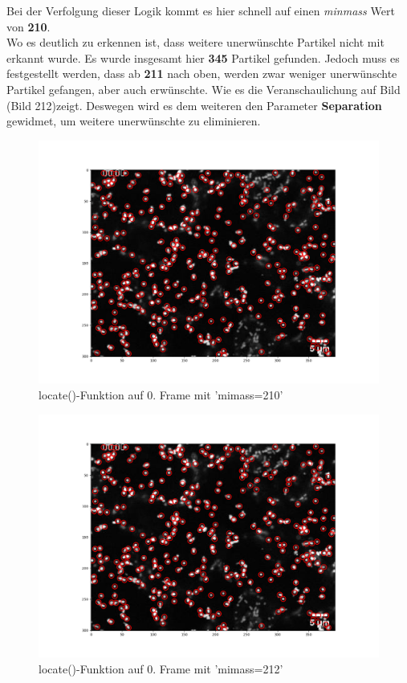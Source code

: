 \begin{enumerate}
Bei der Verfolgung dieser Logik kommt es hier schnell auf einen \textit{minmass} Wert von \textbf{210}.\\
Wo es deutlich zu erkennen ist, dass weitere unerwünschte Partikel nicht mit erkannt wurde. Es wurde insgesamt hier \textbf{345} Partikel gefunden. Jedoch muss es festgestellt werden, dass ab \textbf{211} nach oben, werden zwar weniger unerwünschte Partikel gefangen, aber auch erwünschte. 
Wie es die Veranschaulichung auf Bild (Bild 212)zeigt. 
Deswegen wird es dem weiteren  den Parameter  \textbf{Separation} gewidmet, um weitere unerwünschte zu eliminieren.

\begin{figure}[H]
    \centering
    \includegraphics[scale=0.35]{Grafiken/trackpyBilder/locate_with_minmass_07(210).png}
    \caption{locate()-Funktion auf 0. Frame mit 'mimass=210'}
    \label{fig:kap3_m=210}
\end{figure}


\begin{figure}[H]
    \centering
    \includegraphics[scale=0.35]{Grafiken/trackpyBilder/locate_with_minmass_08(212).png}
    \caption{locate()-Funktion auf 0. Frame mit 'mimass=212'}
    \label{fig:kap3_m=212}
\end{figure}



\end{enumerate}
